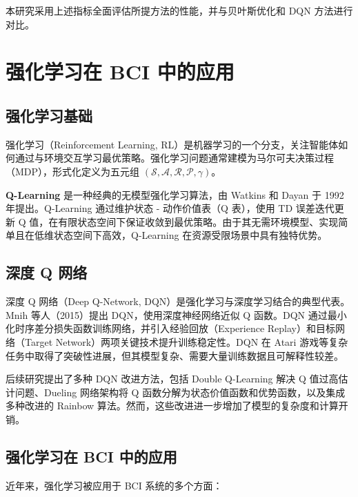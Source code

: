 本研究采用上述指标全面评估所提方法的性能，并与贝叶斯优化和 DQN 方法进行对比。

\section{强化学习在 BCI 中的应用}
\label{sec:rl_in_bci}

\subsection{强化学习基础}
\label{subsec:rl_basics}

强化学习（Reinforcement Learning, RL）是机器学习的一个分支，关注智能体如何通过与环境交互学习最优策略\cite{sutton2018reinforcement}。强化学习问题通常建模为马尔可夫决策过程（MDP），形式化定义为五元组 $(\mathcal{S}, \mathcal{A}, \mathcal{R}, \mathcal{P}, \gamma)$。

\textbf{Q-Learning} 是一种经典的无模型强化学习算法，由 Watkins 和 Dayan 于 1992 年提出\cite{watkins1992q}。Q-Learning 通过维护状态 - 动作价值表（Q 表），使用 TD 误差迭代更新 Q 值，在有限状态空间下保证收敛到最优策略。由于其无需环境模型、实现简单且在低维状态空间下高效，Q-Learning 在资源受限场景中具有独特优势。

\subsection{深度 Q 网络}
\label{subsec:deep_q_network}

深度 Q 网络（Deep Q-Network, DQN）是强化学习与深度学习结合的典型代表。Mnih 等人（2015）提出 DQN，使用深度神经网络近似 Q 函数\cite{mnih2015human}。DQN 通过最小化时序差分损失函数训练网络，并引入经验回放（Experience Replay）和目标网络（Target Network）两项关键技术提升训练稳定性。DQN 在 Atari 游戏等复杂任务中取得了突破性进展，但其模型复杂、需要大量训练数据且可解释性较差。

后续研究提出了多种 DQN 改进方法，包括 Double Q-Learning 解决 Q 值过高估计问题\cite{van2016deep}、Dueling 网络架构将 Q 函数分解为状态价值函数和优势函数\cite{wang2016dueling}，以及集成多种改进的 Rainbow 算法\cite{hessel2018rainbow}。然而，这些改进进一步增加了模型的复杂度和计算开销。

\subsection{强化学习在 BCI 中的应用}
\label{subsec:rl_bci_applications}

近年来，强化学习被应用于 BCI 系统的多个方面\cite{zhang2021mars}：

